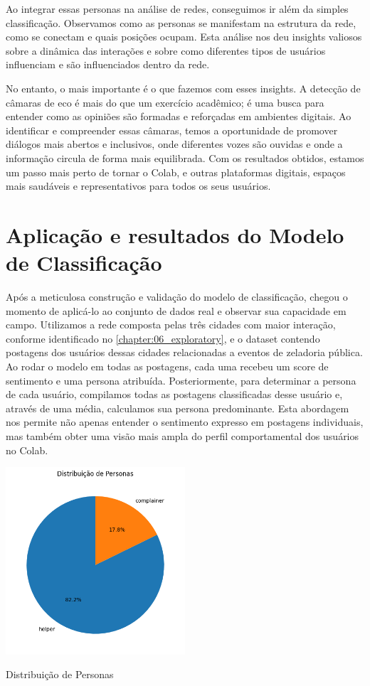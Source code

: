 Ao integrar essas personas na análise de redes, conseguimos ir além da simples classificação. Observamos como as personas se manifestam na estrutura da rede, como se conectam e quais posições ocupam. Esta análise nos deu insights valiosos sobre a dinâmica das interações e sobre como diferentes tipos de usuários influenciam e são influenciados dentro da rede.

No entanto, o mais importante é o que fazemos com esses insights. A detecção de câmaras de eco é mais do que um exercício acadêmico; é uma busca para entender como as opiniões são formadas e reforçadas em ambientes digitais. Ao identificar e compreender essas câmaras, temos a oportunidade de promover diálogos mais abertos e inclusivos, onde diferentes vozes são ouvidas e onde a informação circula de forma mais equilibrada. Com os resultados obtidos, estamos um passo mais perto de tornar o Colab, e outras plataformas digitais, espaços mais saudáveis e representativos para todos os seus usuários.

\section{Aplicação e resultados do Modelo de Classificação}

Após a meticulosa construção e validação do modelo de classificação, chegou o momento de aplicá-lo ao conjunto de dados real e observar sua capacidade em campo. Utilizamos a rede composta pelas três cidades com maior interação, conforme identificado no \autoref{chapter:06_exploratory}, e o dataset contendo postagens dos usuários dessas cidades relacionadas a eventos de zeladoria pública. Ao rodar o modelo em todas as postagens, cada uma recebeu um score de sentimento e uma persona atribuída. Posteriormente, para determinar a persona de cada usuário, compilamos todas as postagens classificadas desse usuário e, através de uma média, calculamos sua persona predominante. Esta abordagem nos permite não apenas entender o sentimento expresso em postagens individuais, mas também obter uma visão mais ampla do perfil comportamental dos usuários no Colab.

\begin{quadro}[htb]
    \centering
    \includegraphics[width=0.5\textwidth]{images/personas_pie.png}
    \caption{Distribuição de Personas}
    \label{fig:personas_pie}
\end{quadro}

